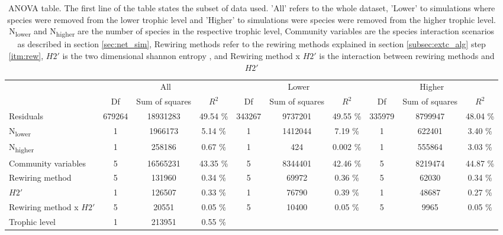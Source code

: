 \documentclass[12pt,a4paper]{article}
\begin{document}
\begin{landscape}
\begin{table}
\label{tab:anova}
\caption{ANOVA table. The first line of the table states the subset of data used. 'All' refers to the whole dataset, 'Lower' to simulations where species were removed from the lower trophic level and 'Higher' to simulations were species were removed from the higher trophic level. N\textsubscript{lower} and N\textsubscript{higher} are the number of species in the respective trophic level, Community variables are the species interaction scenarios as described in section \ref{sec:net_sim}, Rewiring methods refer to the rewiring methods explained in section \ref{subsec:extc_alg} step \ref{itm:rew}, $H2'$ is the two dimensional shannon entropy \parencite{Bluethgen2006}, and Rewiring method x $H2'$ is the interaction between rewiring methods and $H2'$}
\begin{tabularx}{\linewidth}{@{} X *9{c} @{}}
\toprule
  & \multicolumn{3}{c}{All} & \multicolumn{3}{c}{Lower} & \multicolumn{3}{c}{Higher} \\ \cmidrule(l){2-4} \cmidrule(l){5-7} \cmidrule(l){8-10}
  & Df & Sum of squares & $R^2$ & Df & Sum of squares & $R^2$ & Df & Sum of squares & $R^2$  \\ \midrule
Residuals & 679264 & 18931283 & 49.54 \% & 343267 & 9737201 & 49.55 \% & 335979 & 8799947 & 48.04 \%\\ 
N\textsubscript{lower} & 1 & 1966173 & 5.14 \% & 1 & 1412044 & 7.19 \% & 1 & 622401 & 3.40 \%\\
N\textsubscript{higher} & 1 & 258186 & 0.67 \% & 1 & 424 & 0.002 \% & 1 & 555864 & 3.03 \%\\
Community variables & 5 & 16565231 & 43.35 \% & 5 & 8344401 & 42.46 \% & 5 & 8219474 & 44.87 \%\\
Rewiring method & 5 & 131960 & 0.34 \% & 5 & 69972 & 0.36 \% & 5 & 62030 & 0.34 \%\\ 
$H2'$ & 1 & 126507 & 0.33 \% & 1 & 76790 & 0.39 \% & 1 & 48687 & 0.27 \%\\
Rewiring method x $H2'$ & 5 & 20551 & 0.05 \% & 5 & 10400 & 0.05 \% & 5 & 9965 & 0.05 \%\\ 
Trophic level & 1 & 213951 & 0.55 \%  \\ \bottomrule
\end{tabularx}
\end{table}
\end{landscape}



\begin{multicols}{2}[\printbibheading]
\printbibliography[heading=none]
\end{multicols}
\end{document}
